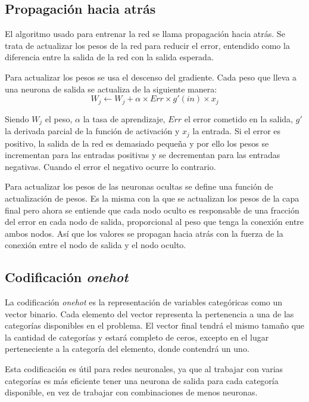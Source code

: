 \subsection{Propagación hacia atrás}

El algoritmo usado para entrenar la red se llama propagación hacia atrás. Se
trata de actualizar los pesos de la red para reducir el error, entendido como
la diferencia entre la salida de la red con la salida esperada.

Para actualizar los pesos se usa el descenso del gradiente. Cada peso que lleva
a una neurona de salida se actualiza de la siguiente manera: 
\[
    W_j \leftarrow W_j + \alpha \times Err \times g'(in) \times x_j
\]

Siendo $W_j$ el peso, $\alpha$ la tasa de aprendizaje, $Err$ el error cometido
en la salida, $g'$ la derivada parcial de la función de activación y $x_j$ la
entrada. Si el error es positivo, la salida de la red es demasiado pequeña y por
ello los pesos se incrementan para las entradas positivas y se decrementan para
las entradas negativas. Cuando el error el negativo ocurre lo contrario.

Para actualizar los pesos de las neuronas ocultas se define una función de
actualización de pesos. Es la misma con la que se actualizan los pesos de la
capa final pero ahora se entiende que cada nodo oculto es responsable de una
fracción del error en cada nodo de salida, proporcional al peso que tenga la
conexión entre ambos nodos. Así que los valores se propagan hacia atrás con la
fuerza de la conexión entre el nodo de salida y el nodo oculto.

\subsection{Codificación \textit{onehot}}

La codificación \textit{onehot} es la representación de variables categóricas
como un vector binario. Cada elemento del vector representa la pertenencia a
una de las categorías disponibles en el problema. El vector final tendrá el
mismo tamaño que la cantidad de categorías y estará completo de ceros, excepto
en el lugar perteneciente a la categoría del elemento, donde contendrá un uno.

Esta codificación es útil para redes neuronales, ya que al trabajar con varias
categorías es más eficiente tener una neurona de salida para cada categoría
disponible, en vez de trabajar con combinaciones de menos neuronas.


